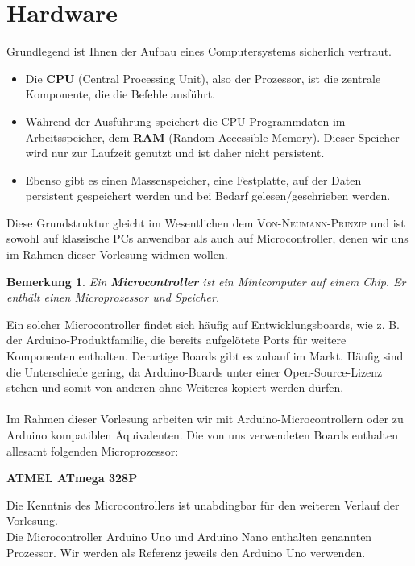 \documentclass[11pt,a4paper]{scrartcl}
\newtheorem{note}{Bemerkung}
\begin{document}
\section{Hardware}
Grundlegend ist Ihnen der Aufbau eines Computersystems sicherlich vertraut.
\begin{itemize}
\item Die \textbf{CPU} (Central Processing Unit), also der Prozessor, ist die zentrale Komponente, die die Befehle ausführt.
\item Während der Ausführung speichert die CPU Programmdaten im Arbeitsspeicher, dem \textbf{RAM} (Random Accessible Memory). Dieser Speicher wird nur zur Laufzeit genutzt und ist daher nicht persistent.
\item Ebenso gibt es einen Massenspeicher, eine Festplatte, auf der Daten persistent gespeichert werden und bei Bedarf gelesen/geschrieben werden.
\end{itemize}
Diese Grundstruktur gleicht im Wesentlichen dem \textsc{Von-Neumann-Prinzip} und ist sowohl auf klassische PCs anwendbar als auch auf Microcontroller, denen wir uns im Rahmen dieser Vorlesung widmen wollen.
\\
\begin{note}
Ein \textbf{Microcontroller} ist ein Minicomputer auf einem Chip. Er enthält einen Microprozessor und Speicher.
\end{note}
Ein solcher Microcontroller findet sich häufig auf Entwicklungsboards, wie z. B. der Arduino-Produktfamilie, die bereits aufgelötete Ports für weitere Komponenten enthalten. Derartige Boards gibt es zuhauf im Markt. Häufig sind die Unterschiede gering, da Arduino-Boards unter einer Open-Source-Lizenz stehen und somit von anderen ohne Weiteres kopiert werden dürfen. \\\\
Im Rahmen dieser Vorlesung arbeiten wir mit Arduino-Microcontrollern oder zu Arduino kompatiblen Äquivalenten. Die von uns verwendeten Boards enthalten allesamt folgenden Microprozessor:
\begin{center}
\textbf{ATMEL ATmega 328P}
\end{center}
Die Kenntnis des Microcontrollers ist unabdingbar für den weiteren Verlauf der Vorlesung. \\
Die Microcontroller Arduino Uno und Arduino Nano enthalten genannten Prozessor. Wir werden als Referenz jeweils den Arduino Uno verwenden.
\end{document}
